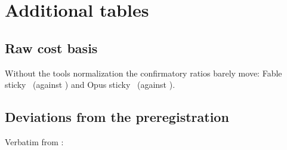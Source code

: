 \section{Additional tables}\label{app:tables}

\begin{table}[htbp]
\centering\small
\caption{Savings-model check by arm and host, test split: prediction-interval coverage and the observed total
saving against its predicted 90\,\% interval.}
\label{tab:modelcheck}

\end{table}

\begin{table}[htbp]
\centering\small
\caption{A/A noise floor: second plain-host session against the first. ``SD'' is the standard deviation of
the log ratio per pair and per single session.}
\label{tab:aa}

\end{table}

\begin{table}[htbp]
\centering\small
\caption{Interim and final cost ratios behind \cref{fig:interim}.}
\label{tab:interim}

\end{table}

\begin{table}[htbp]
\centering\small
\caption{Cost ratio by pause pattern, all splits (95\,\% CI). Exploratory.}
\label{tab:slicegap}

\end{table}

\begin{table}[htbp]
\centering\small
\caption{Cost ratio by scripted session length, all splits (95\,\% CI). Exploratory.}
\label{tab:sliceturns}

\end{table}

\subsection*{Raw cost basis}\label{sec:rawbasis}
Without the tools normalization the confirmatory ratios barely move: Fable sticky \RawFableSticky\ (against
\CfFableStickyPair) and Opus sticky \RawOpusSticky\ (against \CfOpusStickyPair).

\subsection*{Deviations from the preregistration}\label{sec:deviations}
Verbatim from :
{\small}

